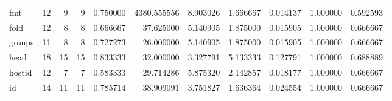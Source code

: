 \begin{longtable}{lrrrrrrrrrr}
fmt       &                                      12 &                  9 &                                 9 &                                   0.750000 &                            4380.555556 &                                     8.903026 &                          1.666667 &                                0.014137 &                           1.000000 &                                           0.592593 \\
fold      &                                      12 &                  8 &                                 8 &                                   0.666667 &                              37.625000 &                                     5.140905 &                          1.875000 &                                0.015905 &                           1.000000 &                                           0.666667 \\
groups    &                                      11 &                  8 &                                 8 &                                   0.727273 &                              26.000000 &                                     5.140905 &                          1.875000 &                                0.015905 &                           1.000000 &                                           0.666667 \\
head      &                                      18 &                 15 &                                15 &                                   0.833333 &                              32.000000 &                                     3.327791 &                          5.133333 &                                0.127791 &                           1.000000 &                                           0.688889 \\
hostid    &                                      12 &                  7 &                                 7 &                                   0.583333 &                              29.714286 &                                     5.875320 &                          2.142857 &                                0.018177 &                           1.000000 &                                           0.666667 \\
id        &                                      14 &                 11 &                                11 &                                   0.785714 &                              38.909091 &                                     3.751827 &                          1.636364 &                                0.024554 &                           1.000000 &                                           0.666667 \\

\end{longtable}
